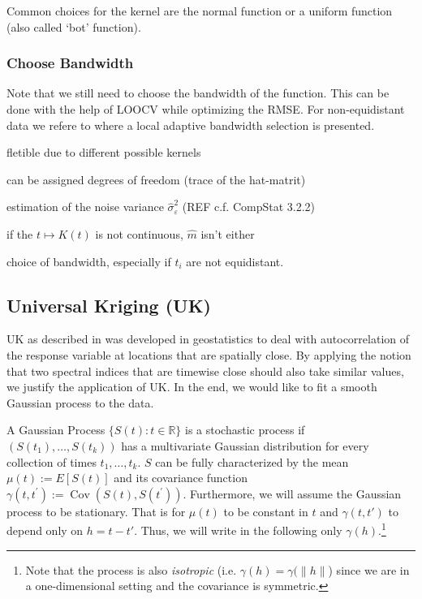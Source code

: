 		Common choices for the kernel are the normal function or a uniform function (also called `bot' function). 
		\subsubsection*{Choose Bandwidth}
		Note that we still need to choose the bandwidth of the function. This can be done with the help of LOOCV while optimizing the RMSE. For non-equidistant data we refere to \cite{brockmannLocallyAdaptiveBandwidth1993} where a local adaptive bandwidth selection is presented.

		\begin{my_pros_cons_table}{
				\item fletible due to different possible kernels
				\item can be assigned degrees of freedom (trace of the hat-matrit)
				\item estimation of the noise variance $\hat \sigma_\varepsilon^2$ (REF c.f. CompStat 3.2.2)
			}{
				\item if the $t \mapsto K(t)$ is not continuous, $\hat m $ isn't either
				\item choice of bandwidth, especially if $t_i$ are not equidistant.
			}
		\end{my_pros_cons_table}


	\subsection{Universal Kriging (UK)}
		\label{sec:Kriging}

		UK as described in \cite{diggleGaussianModelsGeostatistical2007} was developed in geostatistics to deal with autocorrelation of the response variable at locations that are spatially close. By applying the notion that two spectral indices that are timewise close should also take similar values, we justify the application of UK. In the end, we would like to fit a smooth Gaussian process to the data.

		A Gaussian Process $\{S(t) : t\in \mathbb R\} $ is a stochastic process if $(S(t_1),\dots,S(t_k))$ has a multivariate Gaussian distribution for every collection of times ${t_1, \dots , t_k}$. $S$ can be fully characterized by the mean $\mu(t):=E[S(t)]$ and its covariance function $\gamma\left(t, t^{\prime}\right):=\operatorname{Cov}\left(S(t), S\left(t^{\prime}\right)\right)$. 
		Furthermore, we will assume the Gaussian process to be stationary. That is for $\mu(t)$ to be constant in $t$ and $\gamma(t,t')$ to depend only on $h=t-t'$. Thus, we will write in the following only $\gamma(h)$.\footnote{Note that the process is also \textit{isotropic} (i.e. $\gamma(h)=\gamma(\|h\|$) since we are in a one-dimensional setting and the covariance is symmetric.}

